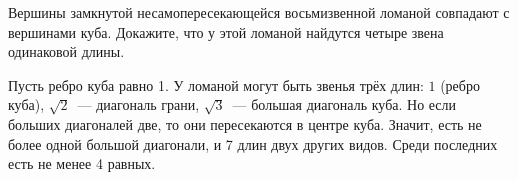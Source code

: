 \problem
Вершины замкнутой несамопересекающейся восьмизвенной ломаной совпадают с
вершинами куба.
Докажите, что у этой ломаной найдутся четыре звена одинаковой длины.

\solution
Пусть ребро куба равно 1.
У ломаной могут быть звенья трёх длин:
$1$ (ребро куба),
$\sqrt{2}$~--- диагональ грани,
$\sqrt{3}$~--- большая диагональ куба.
Но если больших диагоналей две, то они пересекаются в центре куба.
Значит, есть не более одной большой диагонали, и 7 длин двух других видов.
Среди последних есть не менее 4 равных.
\endproblem
